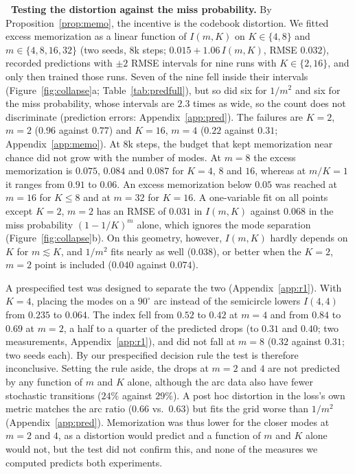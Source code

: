 \leavevmode{}\textbf{\thesubsection\ Testing the distortion against the miss probability.}
\label{sec:collapse}
By Proposition~\ref{prop:memo}, the incentive is the codebook distortion. We fitted excess memorization as a linear function of $I(m,K)$ on $K \in \{4, 8\}$ and $m \in \{4, 8, 16, 32\}$ (two seeds, 8k steps; $0.015 + 1.06\,I(m,K)$, RMSE $0.032$), recorded predictions with $\pm2$ RMSE intervals for nine runs with $K \in \{2, 16\}$, and only then trained those runs. Seven of the nine fell inside their intervals (Figure~\ref{fig:collapse}a; Table~\ref{tab:predfull}), but so did six for $1/m^2$ and six for the miss probability, whose intervals are $2.3$ times as wide, so the count does not discriminate (prediction errors: Appendix~\ref{app:pred}). The failures are $K{=}2$, $m{=}2$ ($0.96$ against $0.77$) and $K{=}16$, $m{=}4$ ($0.22$ against $0.31$; Appendix~\ref{app:memo}). At 8k steps, the budget that kept memorization near chance did not grow with the number of modes. At $m{=}8$ the excess memorization is $0.075$, $0.084$ and $0.087$ for $K = 4$, $8$ and $16$, whereas at $m/K = 1$ it ranges from $0.91$ to $0.06$. An excess memorization below $0.05$ was reached at $m{=}16$ for $K \le 8$ and at $m{=}32$ for $K{=}16$. A one-variable fit on all points except $K{=}2$, $m{=}2$ has an RMSE of $0.031$ in $I(m,K)$ against $0.068$ in the miss probability $(1-1/K)^m$ alone, which ignores the mode separation (Figure~\ref{fig:collapse}b). On this geometry, however, $I(m,K)$ hardly depends on $K$ for $m \lesssim K$, and $1/m^2$ fits nearly as well ($0.038$), or better when the $K{=}2$, $m{=}2$ point is included ($0.040$ against $0.074$).

A prespecified test was designed to separate the two (Appendix~\ref{app:r1}). With $K{=}4$, placing the modes on a $90^\circ$ arc instead of the semicircle lowers $I(4,4)$ from $0.235$ to $0.064$. The index fell from $0.52$ to $0.42$ at $m{=}4$ and from $0.84$ to $0.69$ at $m{=}2$, a half to a quarter of the predicted drops (to $0.31$ and $0.40$; two measurements, Appendix~\ref{app:r1}), and did not fall at $m{=}8$ ($0.32$ against $0.31$; two seeds each). By our prespecified decision rule the test is therefore inconclusive. Setting the rule aside, the drops at $m = 2$ and $4$ are not predicted by any function of $m$ and $K$ alone, although the arc data also have fewer stochastic transitions ($24\%$ against $29\%$). A post hoc distortion in the loss's own metric matches the arc ratio ($0.66$ vs.\ $0.63$) but fits the grid worse than $1/m^2$ (Appendix~\ref{app:pred}). Memorization was thus lower for the closer modes at $m = 2$ and $4$, as a distortion would predict and a function of $m$ and $K$ alone would not, but the test did not confirm this, and none of the measures we computed predicts both experiments.


